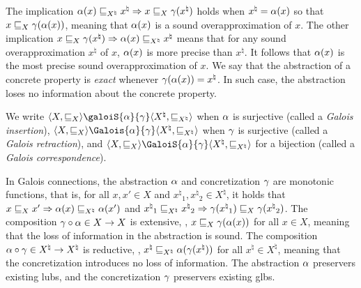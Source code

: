 The implication $\alpha(x) \sqsubseteq_{X^\natural} {x^\natural} \Rightarrow x \sqsubseteq_X \gamma({x^\natural})$ holds when ${x^\natural} = \alpha(x)$ so that $x \sqsubseteq_X \gamma(\alpha(x))$, meaning that $\alpha(x)$ is a sound overapproximation of $x$.
The other implication $x \sqsubseteq_X \gamma({x^\natural}) \Rightarrow \alpha(x) \sqsubseteq_{X^\natural} {x^\natural}$ means that for any sound overapproximation ${x^\natural}$ of $x$, $\alpha(x)$ is more precise than ${x^\natural}$. It follows that $\alpha(x)$ is the most precise sound overapproximation of $x$. We say that the abstraction of a concrete property is \emph{exact} whenever $\gamma(\alpha(x)) = {x^\natural}$. In such case, the abstraction loses no information about the concrete property.

We write $\tuple{X}{\sqsubseteq_X}\galoiS{\abstraction}{\concretization}\tuple{{X^\natural}}{\sqsubseteq_{X^\natural}}$ when $\alpha$ is surjective (called a \emph{Galois insertion}), $\tuple{X}{\sqsubseteq_X}\Galois{\abstraction}{\concretization}\tuple{{X^\natural}}{\sqsubseteq_{X^\natural}}$ when $\gamma$ is surjective (called a \emph{Galois retraction}), and $\tuple{X}{\sqsubseteq_X}\GaloiS{\abstraction}{\concretization}\tuple{{X^\natural}}{\sqsubseteq_{X^\natural}}$ for a bijection (called a \emph{Galois correspondence}).

In Galois connections, the abstraction $\alpha$ and concretization $\gamma$ are monotonic functions, that is, for all $x, x' \in X$ and ${x^\natural}_1, {x^\natural}_2 \in {X^\natural}$, it holds that $x \sqsubseteq_X x' \Rightarrow \alpha(x) \sqsubseteq_{X^\natural} \alpha(x')$ and ${x^\natural}_1 \sqsubseteq_{X^\natural} {x^\natural}_2 \Rightarrow \gamma({x^\natural}_1) \sqsubseteq_X \gamma({x^\natural}_2)$. The composition $\gamma \circ \alpha \in X \to X$ is extensive, \ie, $x \sqsubseteq_X \gamma(\alpha(x))$ for all $x \in X$, meaning that the loss of information in the abstraction is sound. The composition $\alpha \circ \gamma\in {X^\natural} \to {X^\natural}$ is reductive, \ie, ${x^\natural} \sqsubseteq_{X^\natural} \alpha(\gamma({x^\natural}))$ for all ${x^\natural} \in {X^\natural}$, meaning that the concretization introduces no loss of information. The abstraction $\alpha$ preservers existing lubs, and the concretization $\gamma$ preservers existing glbs.

